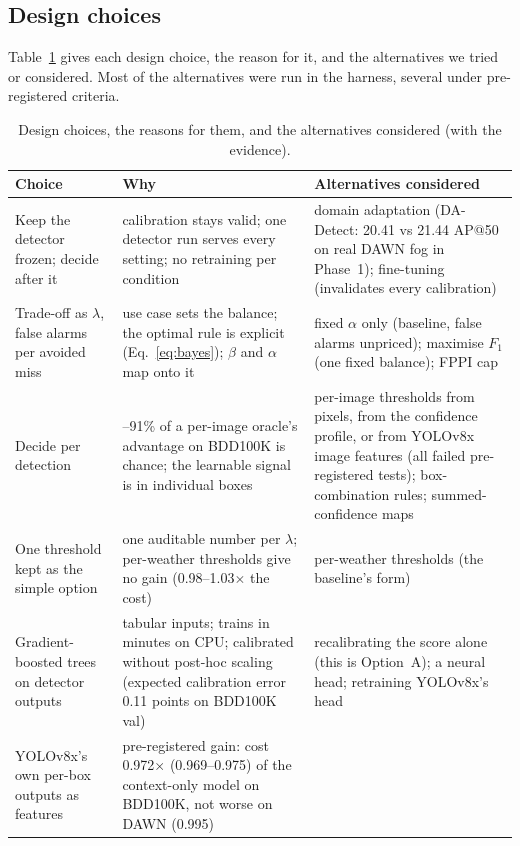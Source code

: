 \subsection{Design choices}\label{sec:method-design}

Table~\ref{tab:design} gives each design choice, the reason for it, and the alternatives we tried or
considered. Most of the alternatives were run in the harness, several under pre-registered criteria.

\begin{table}[t]
\centering\small
\caption{Design choices, the reasons for them, and the alternatives considered (with the evidence).}
\label{tab:design}
\begin{tabularx}{\textwidth}{@{}>{\raggedright\arraybackslash}p{2.9cm}>{\raggedright\arraybackslash}X>{\raggedright\arraybackslash}X@{}}
\toprule
Choice & Why & Alternatives considered \\
\midrule
Keep the detector frozen; decide after it &
calibration stays valid; one detector run serves every setting; no retraining per condition &
domain adaptation (DA-Detect: 20.41 vs 21.44 AP@50 on real DAWN fog in Phase~1); fine-tuning (invalidates every calibration) \\
Trade-off as $\lambda$, false alarms per avoided miss &
use case sets the balance; the optimal rule is explicit (Eq.~\ref{eq:bayes}); $\beta$ and $\alpha$ map onto it &
fixed $\alpha$ only (baseline, false alarms unpriced); maximise $F_1$ (one fixed balance); FPPI cap \\
Decide per detection &
87--91\% of a per-image oracle's advantage on BDD100K is chance; the learnable signal is in individual boxes &
per-image thresholds from pixels, from the confidence profile, or from YOLOv8x image features (all failed pre-registered tests); box-combination rules; summed-confidence maps \\
One threshold kept as the simple option &
one auditable number per $\lambda$; per-weather thresholds give no gain (0.98--1.03$\times$ the cost) &
per-weather thresholds (the baseline's form) \\
Gradient-boosted trees on detector outputs &
tabular inputs; trains in minutes on CPU; calibrated without post-hoc scaling (expected calibration error 0.11 points on BDD100K val) &
recalibrating the score alone (this is Option~A); a neural head; retraining YOLOv8x's head \\
YOLOv8x's own per-box outputs as features &
pre-registered gain: cost 0.972$\times$ (0.969--0.975) of the context-only model on BDD100K, not worse on DAWN (0.995) &

\end{tabularx}
\end{table}

